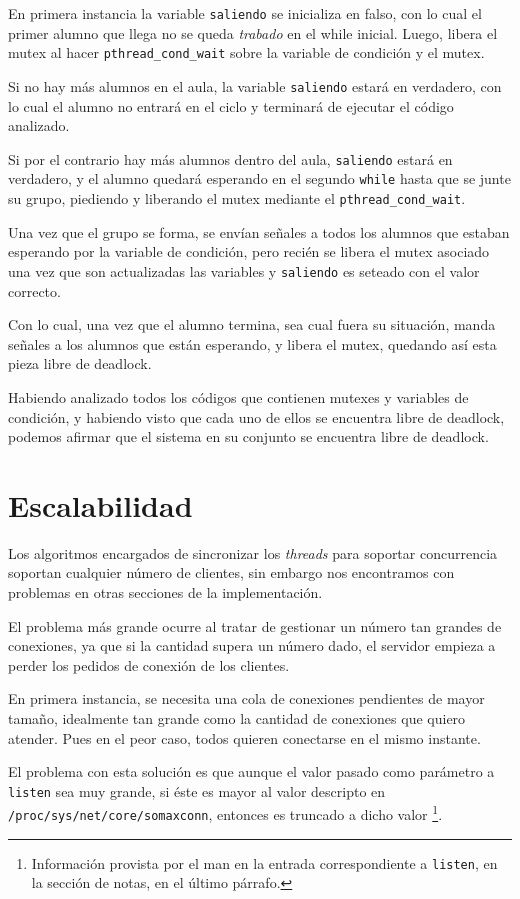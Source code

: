 \documentclass[a4paper]{article}
\begin{document}
En primera instancia la variable \verb|saliendo| se inicializa en falso, con lo cual el primer alumno que llega no se queda \textit{trabado} en el while inicial. Luego, libera el mutex al hacer \verb|pthread_cond_wait| sobre la variable de condición y el mutex.

Si no hay más alumnos en el aula, la variable \verb|saliendo| estará en verdadero, con lo cual el alumno no entrará en el ciclo y terminará de ejecutar el código analizado.

Si por el contrario hay más alumnos dentro del aula, \verb|saliendo| estará en verdadero, y el alumno quedará esperando en el segundo \verb|while| hasta que se junte su grupo, piediendo y liberando el mutex mediante el \verb|pthread_cond_wait|.

Una vez que el grupo se forma, se envían señales a todos los alumnos que estaban esperando por la variable de condición, pero recién se libera el mutex asociado una vez que son actualizadas las variables y \verb|saliendo| es seteado con el valor correcto.

Con lo cual, una vez que el alumno termina, sea cual fuera su situación, manda señales a los alumnos que están esperando, y libera el mutex, quedando así esta pieza libre de deadlock.

Habiendo analizado todos los códigos que contienen mutexes y variables de condición, y habiendo visto que cada uno de ellos se encuentra libre de deadlock, podemos afirmar que el sistema en su conjunto se encuentra libre de deadlock.


\section{Escalabilidad}

Los algoritmos encargados de sincronizar los \textit{threads} para soportar concurrencia soportan cualquier número de clientes, sin embargo nos encontramos con problemas en otras secciones de la implementación.

El problema más grande ocurre al tratar de gestionar un número tan grandes de conexiones, ya que si la cantidad supera un número dado, el servidor empieza a perder los pedidos de conexión de los clientes.

En primera instancia, se necesita una cola de conexiones pendientes de mayor tamaño, idealmente tan grande como la cantidad de conexiones que quiero atender. Pues en el peor caso, todos quieren conectarse en el mismo instante.

El problema con esta solución es que aunque el valor pasado como parámetro a \verb|listen| sea muy grande, si éste es mayor al valor descripto en \verb|/proc/sys/net/core/somaxconn|, entonces es truncado a dicho valor \footnote{Información provista por el man en la entrada correspondiente a \texttt{listen}, en la sección de notas, en el último párrafo.}.
\end{document}
